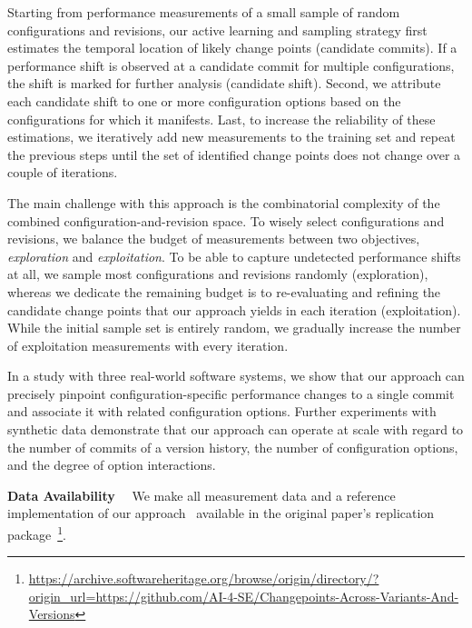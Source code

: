 \documentclass[utf8,biblatex]{lni}
\begin{document}
Starting from performance measurements of a small sample of random configurations and revisions, our active learning and sampling strategy first estimates the temporal location of likely change points (candidate commits). If a performance shift is observed at a candidate commit for multiple configurations, the shift is marked for further analysis (candidate shift). Second, we attribute each candidate shift to one or more configuration options based on the configurations for which it manifests. Last, to increase the reliability of these estimations, we iteratively add new measurements to the training set and repeat the previous steps until the set of identified change points does not change over a couple of iterations.

The main challenge with this approach is the combinatorial complexity of the combined configuration-and-revision space. To wisely select configurations and revisions, we balance the budget of measurements between two objectives, \textit{exploration} and \textit{exploitation}. To be able to capture undetected performance shifts at all, we sample most configurations and revisions randomly ({exploration}), whereas we dedicate the remaining budget is to re-evaluating and refining the candidate change points that our approach yields in each iteration ({exploitation}). While the initial sample set is entirely random, we gradually increase the number of exploitation measurements with every iteration. 


In a study with three real-world software systems, we show that our approach can precisely pinpoint configuration-specific performance changes to a single commit and associate it with related configuration options. Further experiments with synthetic data demonstrate that our approach can operate at scale with regard to the number of commits of a version history, the number of configuration options, and the degree of option interactions.

\textbf{Data Availability}~~
We make all measurement data and a reference implementation of our approach~\cite{muehlbauer_identifying_2020} available in the original paper's replication package~\footnote{\url{https://archive.softwareheritage.org/browse/origin/directory/?origin_url=https://github.com/AI-4-SE/Changepoints-Across-Variants-And-Versions}}.
\printbibliography
\end{document}
